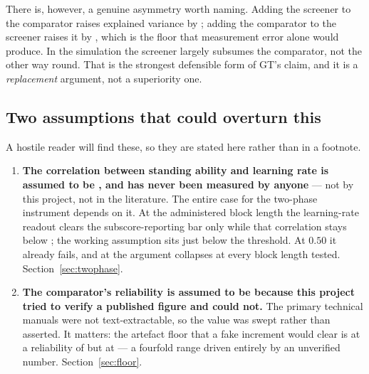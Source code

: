 \documentclass[11pt,a4paper]{article}
\begin{document}

There is, however, a genuine asymmetry worth naming. Adding the screener to the
comparator raises explained variance by \DeltaAddInstr{}; adding the comparator
to the screener raises it by \DeltaAddComp{}, which is \DeltaAddCompVsFloor{}
the floor that measurement error alone would produce. In the simulation the
screener largely subsumes the comparator, not the other way round. That is the
strongest defensible form of GT's claim, and it is a \emph{replacement}
argument, not a superiority one.

\subsection{Two assumptions that could overturn this}
\label{sec:exec-assumptions}

A hostile reader will find these, so they are stated here rather than in a
footnote.

\begin{enumerate}[leftmargin=1.4em,itemsep=0.35em]

\item \textbf{The correlation between standing ability and learning rate is
assumed to be \RhoLRstanding{}, and has never been measured by anyone} --- not
by this project, not in the literature. The entire case for the two-phase
instrument depends on it. At the administered block length the learning-rate
readout clears the subscore-reporting bar only while that correlation stays
below \HabermanThirty{}; the working assumption sits just \HabermanMarginThirty{}
below the threshold. At $0.50$ it already fails, and at \RhoLRcollapse{} the
argument collapses at every block length tested. Section~\ref{sec:twophase}.

\item \textbf{The comparator's reliability is assumed to be \RelComparator{}
because this project tried to verify a published figure and could not.} The
primary technical manuals were not text-extractable, so the value was swept
rather than asserted. It matters: the artefact floor that a fake increment would
clear is \SpuriousMid{} at a reliability of \RelComparator{} but \SpuriousWorst{}
at \RelCompLow{} --- a fourfold range driven entirely by an unverified number.
Section~\ref{sec:floor}.

\end{enumerate}
\end{document}
